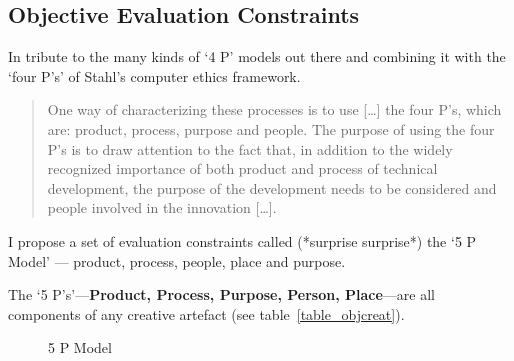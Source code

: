 \subsection{Objective Evaluation Constraints}
\label{s:oec}

In tribute to the many kinds of `4 P' models out there and combining it with the `four P\rq s' of Stahl's computer ethics framework.

\begin{quote}
  One way of characterizing these processes is to use [\ldots] the four P's, which are: product, process, purpose and people. The purpose of using the four P's is to draw attention to the fact that, in addition to the widely recognized importance of both product and process of technical development, the purpose of the development needs to be considered and people involved in the innovation [\ldots]. 
\end{quote}

I propose a set of evaluation constraints called (*surprise surprise*) the `5 P Model' --- product, process, people, place and purpose.



The `5 P\rq s'---\textbf{Product, Process, Purpose, Person, Place}---are all components of any creative artefact (see table~\ref{table_objcreat}).

\begin{figure}[htb] %
  \centering
  \tikzset{every fit/.append style=text badly centered}
\caption[5 P Model]{5 P Model}
\label{fig:5PModel}
\end{figure}

